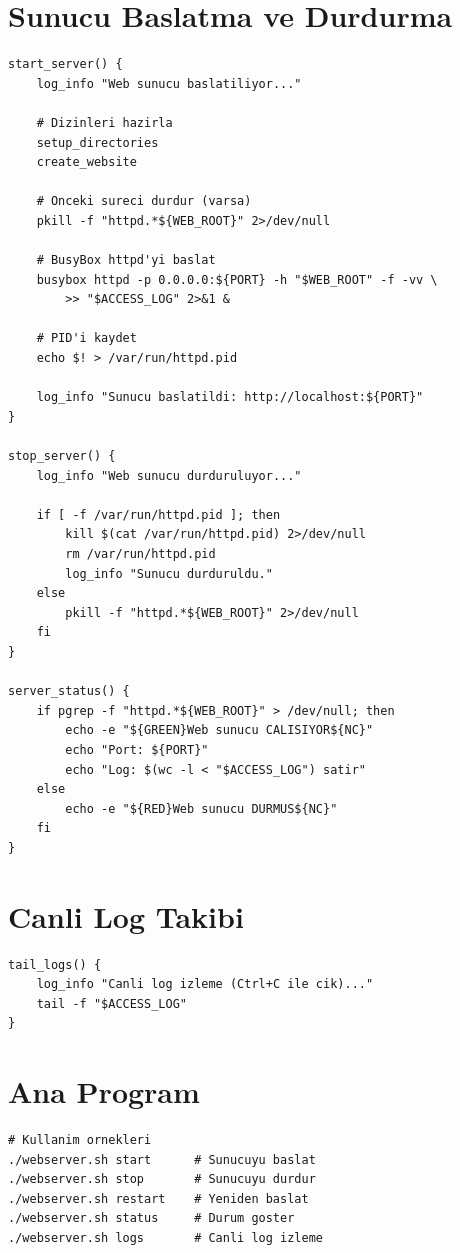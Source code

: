 \documentclass[12pt,a4paper]{report}
\begin{document}
\section{Sunucu Baslatma ve Durdurma}

\begin{lstlisting}[style=bashstyle,caption={Sunucu Kontrolu}]
start_server() {
    log_info "Web sunucu baslatiliyor..."
    
    # Dizinleri hazirla
    setup_directories
    create_website
    
    # Onceki sureci durdur (varsa)
    pkill -f "httpd.*${WEB_ROOT}" 2>/dev/null
    
    # BusyBox httpd'yi baslat
    busybox httpd -p 0.0.0.0:${PORT} -h "$WEB_ROOT" -f -vv \
        >> "$ACCESS_LOG" 2>&1 &
    
    # PID'i kaydet
    echo $! > /var/run/httpd.pid
    
    log_info "Sunucu baslatildi: http://localhost:${PORT}"
}

stop_server() {
    log_info "Web sunucu durduruluyor..."
    
    if [ -f /var/run/httpd.pid ]; then
        kill $(cat /var/run/httpd.pid) 2>/dev/null
        rm /var/run/httpd.pid
        log_info "Sunucu durduruldu."
    else
        pkill -f "httpd.*${WEB_ROOT}" 2>/dev/null
    fi
}

server_status() {
    if pgrep -f "httpd.*${WEB_ROOT}" > /dev/null; then
        echo -e "${GREEN}Web sunucu CALISIYOR${NC}"
        echo "Port: ${PORT}"
        echo "Log: $(wc -l < "$ACCESS_LOG") satir"
    else
        echo -e "${RED}Web sunucu DURMUS${NC}"
    fi
}
\end{lstlisting}

\section{Canli Log Takibi}

\begin{lstlisting}[style=bashstyle,caption={Log Izleme}]
tail_logs() {
    log_info "Canli log izleme (Ctrl+C ile cik)..."
    tail -f "$ACCESS_LOG"
}
\end{lstlisting}

\section{Ana Program}

\begin{lstlisting}[style=bashstyle,caption={webserver.sh Kullanim}]
# Kullanim ornekleri
./webserver.sh start      # Sunucuyu baslat
./webserver.sh stop       # Sunucuyu durdur
./webserver.sh restart    # Yeniden baslat
./webserver.sh status     # Durum goster
./webserver.sh logs       # Canli log izleme
\end{lstlisting}
\end{document}
